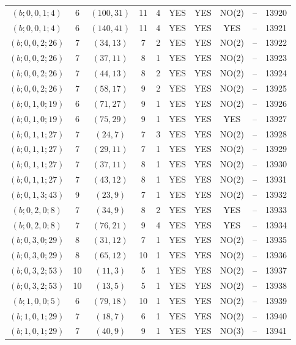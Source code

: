 \begin{longtable}{|c|c|c|c|c|c|c|c|c|c|}
$(b; 0, 0, 1; 4)$ & 6 & $(100, 31)$ & 11 & 4 & YES & YES & NO(2) & -- & 13920\\
$(b; 0, 0, 1; 4)$ & 6 & $(140, 41)$ & 11 & 4 & YES & YES & YES & -- & 13921\\
$(b; 0, 0, 2; 26)$ & 7 & $(34, 13)$ & 7 & 2 & YES & YES & NO(2) & -- & 13922\\
$(b; 0, 0, 2; 26)$ & 7 & $(37, 11)$ & 8 & 1 & YES & YES & NO(2) & -- & 13923\\
$(b; 0, 0, 2; 26)$ & 7 & $(44, 13)$ & 8 & 2 & YES & YES & NO(2) & -- & 13924\\
$(b; 0, 0, 2; 26)$ & 7 & $(58, 17)$ & 9 & 2 & YES & YES & NO(2) & -- & 13925\\
$(b; 0, 1, 0; 19)$ & 6 & $(71, 27)$ & 9 & 1 & YES & YES & NO(2) & -- & 13926\\
$(b; 0, 1, 0; 19)$ & 6 & $(75, 29)$ & 9 & 1 & YES & YES & YES & -- & 13927\\
$(b; 0, 1, 1; 27)$ & 7 & $(24, 7)$ & 7 & 3 & YES & YES & NO(2) & -- & 13928\\
$(b; 0, 1, 1; 27)$ & 7 & $(29, 11)$ & 7 & 1 & YES & YES & NO(2) & -- & 13929\\
$(b; 0, 1, 1; 27)$ & 7 & $(37, 11)$ & 8 & 1 & YES & YES & NO(2) & -- & 13930\\
$(b; 0, 1, 1; 27)$ & 7 & $(43, 12)$ & 8 & 1 & YES & YES & NO(2) & -- & 13931\\
$(b; 0, 1, 3; 43)$ & 9 & $(23, 9)$ & 7 & 1 & YES & YES & NO(2) & -- & 13932\\
$(b; 0, 2, 0; 8)$ & 7 & $(34, 9)$ & 8 & 2 & YES & YES & YES & -- & 13933\\
$(b; 0, 2, 0; 8)$ & 7 & $(76, 21)$ & 9 & 4 & YES & YES & YES & -- & 13934\\
$(b; 0, 3, 0; 29)$ & 8 & $(31, 12)$ & 7 & 1 & YES & YES & NO(2) & -- & 13935\\
$(b; 0, 3, 0; 29)$ & 8 & $(65, 12)$ & 10 & 1 & YES & YES & NO(2) & -- & 13936\\
$(b; 0, 3, 2; 53)$ & 10 & $(11, 3)$ & 5 & 1 & YES & YES & NO(2) & -- & 13937\\
$(b; 0, 3, 2; 53)$ & 10 & $(13, 5)$ & 5 & 1 & YES & YES & NO(2) & -- & 13938\\
$(b; 1, 0, 0; 5)$ & 6 & $(79, 18)$ & 10 & 1 & YES & YES & NO(2) & -- & 13939\\
$(b; 1, 0, 1; 29)$ & 7 & $(18, 7)$ & 6 & 1 & YES & YES & NO(2) & -- & 13940\\
$(b; 1, 0, 1; 29)$ & 7 & $(40, 9)$ & 9 & 1 & YES & YES & NO(3) & -- & 13941\\

\end{longtable}
